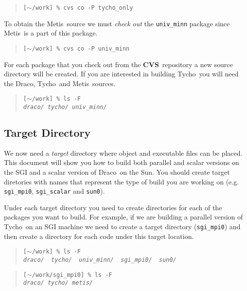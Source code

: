 \documentclass[10pt]{nmemo}
\newcommand{\comp}[1]{\normalfont\normalsize\texttt{#1}}
\newcommand{\draco}{{\normalfont\sffamily Draco}}
\newcommand{\tycho}{{\normalfont\sffamily Tycho}}
\newcommand{\metis}{{\normalfont\sffamily Metis}}
\newcommand{\cvs}{{\normalfont\bfseries CVS}}
\begin{document}
\footnotesize
\begin{verse}
\texttt{[$\sim$/work] \% cvs co -P tycho\_only}
\end{verse}
\normalsize

To obtain the \metis\ source we must \emph{check out} the
\comp{univ\_minn} package since \metis\ is a part of this package.

\footnotesize
\begin{verse}
\texttt{[$\sim$/work] \% cvs co -P univ\_minn}
\end{verse}
\normalsize

For each package that you check out from the \cvs\ repository a new
source directory will be created.  If you are interested in building
\tycho\ you will need the \draco, \tycho\ and \metis\ sources.

\footnotesize
\begin{verse}
\texttt{[$\sim$/work] \% ls -F \\
\emph{draco/  tycho/  univ\_minn/}}
\end{verse}
\normalsize

\subsection{Target Directory}

We now need a \emph{target} directory where object and executable
files can be placed.  This document will show you how to build both
parallel and scalar versions on the SGI and a scalar version of
\draco\ on the Sun.  You should create target diretories with names
that represent the type of build you are working on
(e.g. \comp{sgi\_mpi0}, \comp{sgi\_scalar} and \comp{sun0}).

Under each target directory you need to create directories for each of
the packages you want to build.  For example, if we are building a
parallel version of \tycho\ on an SGI machine we need to create a
target directory (\comp{sgi\_mpi0}) and then create a directory for
each code under this target location.

\footnotesize
\begin{verse}
\texttt{[$\sim$/work] \% ls -F \\
\emph{draco/\ \ tycho/\ \ univ\_minn/\ \ sgi\_mpi0/\ \ sun0/ }}
\end{verse}

\begin{verse}
\texttt{[$\sim$/work/sgi\_mpi0] \% ls -F \\
\emph{draco/  tycho/  metis/}}
\end{verse}
\normalsize
\end{document}
